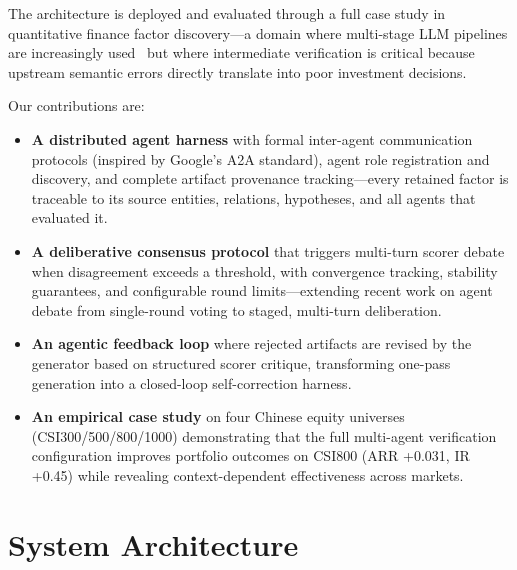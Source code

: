 \documentclass[sigconf]{acmart}
\begin{document}
The architecture is deployed and evaluated through a full case study in quantitative finance factor discovery---a domain where multi-stage LLM pipelines are increasingly used~\cite{wang2024alphagpt,tang2025alphaagent,shi2025alphaforge} but where intermediate verification is critical because upstream semantic errors directly translate into poor investment decisions.

Our contributions are:
\begin{itemize}
    \item \textbf{A distributed agent harness} with formal inter-agent communication protocols (inspired by Google's A2A standard), agent role registration and discovery, and complete artifact provenance tracking---every retained factor is traceable to its source entities, relations, hypotheses, and all agents that evaluated it.
    \item \textbf{A deliberative consensus protocol} that triggers multi-turn scorer debate when disagreement exceeds a threshold, with convergence tracking, stability guarantees, and configurable round limits---extending recent work on agent debate from single-round voting to staged, multi-turn deliberation.
    \item \textbf{An agentic feedback loop} where rejected artifacts are revised by the generator based on structured scorer critique, transforming one-pass generation into a closed-loop self-correction harness.
    \item \textbf{An empirical case study} on four Chinese equity universes (CSI300/500/800/1000) demonstrating that the full multi-agent verification configuration improves portfolio outcomes on CSI800 (ARR +0.031, IR +0.45) while revealing context-dependent effectiveness across markets.
\end{itemize}

\section{System Architecture}
\end{document}
